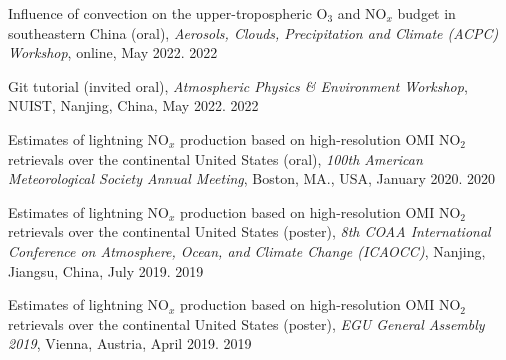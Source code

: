 \begin{cvpublications}

\publication
{Influence of convection on the upper-tropospheric O$_3$ and NO$_x$ budget in southeastern China (oral),
\emph{Aerosols, Clouds, Precipitation and Climate (ACPC) Workshop},
online, May 2022.} %
{2022} %

\publication
{Git tutorial (invited oral),
\emph{Atmospheric Physics \& Environment Workshop},
NUIST, Nanjing, China, May 2022.} %
{2022} %

\publication
{Estimates of lightning NO$_x$ production based on high-resolution OMI NO$_2$ retrievals over the continental United States (oral),
\emph{100th American Meteorological Society Annual Meeting},
Boston, MA., USA, January 2020.} %
{2020} %

\publication
{Estimates of lightning NO$_x$ production based on high-resolution OMI NO$_2$ retrievals over the continental United States (poster),
\emph{8th COAA International Conference on Atmosphere, Ocean, and Climate Change (ICAOCC)},
Nanjing, Jiangsu, China, July 2019.} %
{2019} %

\publication
{Estimates of lightning NO$_x$ production based on high-resolution OMI NO$_2$ retrievals over the continental United States (poster),
\emph{EGU General Assembly 2019},
Vienna, Austria, April 2019.} %
{2019} %

\end{cvpublications}
